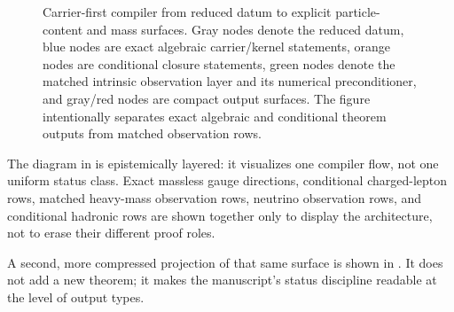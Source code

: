 \documentclass[11pt,a4paper]{article}
\theoremstyle{definition}
\theoremstyle{remark}
\begin{document}
\begin{figure}[p]
\caption{Carrier-first compiler from reduced datum to explicit particle-content and mass
surfaces. Gray nodes denote the reduced datum, blue nodes are exact algebraic carrier/kernel
statements, orange nodes are conditional closure statements, green nodes denote the matched
intrinsic observation layer and its numerical preconditioner, and gray/red nodes are compact
output surfaces. The figure intentionally separates exact algebraic and conditional theorem
outputs from matched observation rows.}
\label{fig:compiler-to-masses}
\end{figure}

The diagram in  is epistemically layered: it visualizes one
compiler flow, not one uniform status class. Exact massless gauge directions, conditional
charged-lepton rows, matched heavy-mass observation rows, neutrino observation rows, and
conditional hadronic rows are shown together only to display the architecture, not to erase
their different proof roles.

A second, more compressed projection of that same surface is shown in . It does not add a new theorem; it makes the manuscript's status discipline readable at the level of output types.
\end{document}
